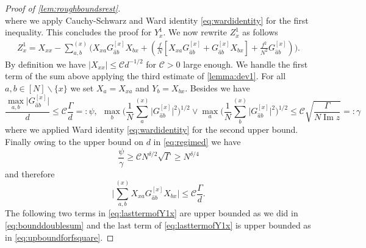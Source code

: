 \documentclass[10pt,a4paper]{amsart}
\DeclareMathOperator{\Ima}{Im}
\newcommand{\abs}[1]{\left| #1 \right|}
\newcommand{\absb}[1]{\bigl| #1 \bigr|}
\newcommand{\absbb}[1]{\biggl| #1 \biggr|}
\numberwithin{equation}{section}
\newcommand*\bset[1]{[#1]}
\newcommand*\ubarr[1]{{\widehat{#1}}}
\begin{document}
\begin{proof}[Proof of \cref{lem:roughboundsrest}]
\begin{equation}
		\end{equation}
		where we apply Cauchy-Schwarz and Ward identity \cref{eq:wardidentity} for the first inequality. This concludes the proof for $Y^1_x$. We now rewrite $Z^1_x$ as follows
		\begin{align}\label{eq:lasttermofY1x}
			Z^1_x = X_{xx} -\sum_{a,b}^{(x)} \biggl(X_{xa}G_{\ubarr{a}b}^{\bset{x}} X_{bx}  +\left(\frac{f}{N}\left[ X_{xa}G_{\ubarr{a}b}^{\bset{x}} + G_{\ubarr{a}b}^{\bset{x}}X_{bx} \right] + \frac{f^2}{N^2} G_{ \ubarr{a}b}^{\bset{x}}\right) \biggr).
		\end{align}
		By definition we have $\abs{X_{xx}} \le \mathcal{C}d^{-1/2}$ for $\mathcal{C} >0 $ large enough. We handle the first term of the sum above applying the third estimate of \cref{lemma:dev1}. For all $a,b\in [N] \backslash \{x\}$ we set $X_{a} = X_{xa}$ and $Y_{b} = X_{bx}$. 
		Besides we have
		\begin{equation*}
			\frac{\max_{a,b} \absb{G_{\ubarr{a}b}^{\bset{x}}}}{d} \le\mathcal{C} \frac{\Gamma}{d} =: \psi,~~\max_{b}\biggl( \frac{1}{N} \sum_{a}^{(x)} \absb{G^{\bset{x}}_{\ubarr{a}b}}^2 \biggr)^{1/2}\vee \max_{a}\biggl( \frac{1}{N}  \sum_{b}^{(x)} \absb{G^{\bset{x}}_{\ubarr{a}b}}^2 \biggr)^{1/2} \le \mathcal{C}\sqrt{\frac{\Gamma}{N\Ima z}}=: \gamma
		\end{equation*}
		where we applied Ward identity \cref{eq:wardidentity} for the second upper bound. Finally owing to the upper bound on $d$ in \cref{eq:regimed} we have
		\begin{equation*}
			 \frac{\psi}{\gamma} \ge \mathcal{C} N^{\delta/2} \sqrt{\Gamma}\ge N^{\delta/4}
		\end{equation*}
		and therefore
		\begin{equation*}
			\absbb{\sum_{a,b}^{(x)} X_{xa} G_{ \ubarr{a}b}^{\bset{x}} X_{bx} }  \le \mathcal{C}\frac{\Gamma}{d}.
		\end{equation*}
		The following two terms in \cref{eq:lasttermofY1x} are upper bounded as we did in \cref{eq:bounddoublesum} and the last term of \cref{eq:lasttermofY1x} is upper bounded as in \cref{eq:upboundforfsquare}. 
		

\end{proof}
\end{document}
